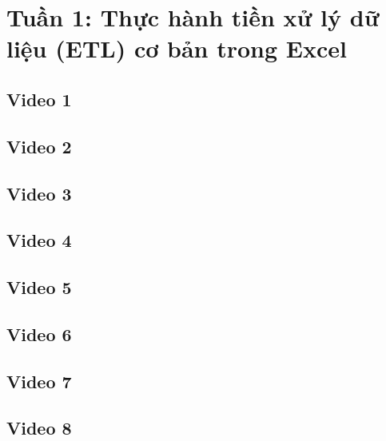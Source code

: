 \documentclass{article}
\begin{document}
\tableofcontents
\newpage
\listoffigures
\newpage
\section{Tuần 1: Thực hành tiền xử lý dữ liệu (ETL) cơ bản trong Excel}
\subsection{Video 1}


\subsection{Video 2}


\subsection{Video 3}
\subsection{Video 4}

\subsection{Video 5}
\subsection{Video 6}

\subsection{Video 7}

\subsection{Video 8}

\end{document}
